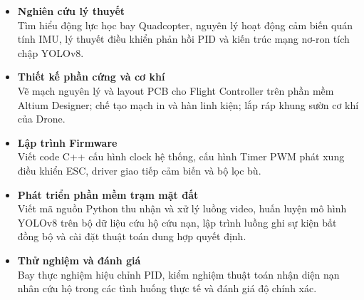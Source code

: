 \begin{itemize}
    \item \textbf{Nghiên cứu lý thuyết}\\
    Tìm hiểu động lực học bay Quadcopter, nguyên lý hoạt động cảm biến quán tính IMU, lý thuyết điều khiển phản hồi PID và kiến trúc mạng nơ-ron tích chập YOLOv8.
    
    \item \textbf{Thiết kế phần cứng và cơ khí}\\
    Vẽ mạch nguyên lý và layout PCB cho Flight Controller trên phần mềm Altium Designer; chế tạo mạch in và hàn linh kiện; lắp ráp khung sườn cơ khí của Drone.
    
    \item \textbf{Lập trình Firmware}\\
    Viết code C++ cấu hình clock hệ thống, cấu hình Timer PWM phát xung điều khiển ESC, driver giao tiếp cảm biến và bộ lọc bù.
    
    \item \textbf{Phát triển phần mềm trạm mặt đất}\\
    Viết mã nguồn Python thu nhận và xử lý luồng video, huấn luyện mô hình YOLOv8 trên bộ dữ liệu cứu hộ cứu nạn, lập trình luồng ghi sự kiện bất đồng bộ và cài đặt thuật toán dung hợp quyết định.
    
    \item \textbf{Thử nghiệm và đánh giá}\\
    Bay thực nghiệm hiệu chỉnh PID, kiểm nghiệm thuật toán nhận diện nạn nhân cứu hộ trong các tình huống thực tế và đánh giá độ chính xác.
\end{itemize}

